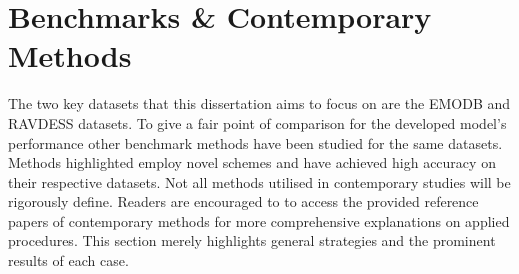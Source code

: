 \section{Benchmarks \& Contemporary Methods}
The two key datasets that this dissertation aims to focus on are the EMODB and RAVDESS datasets. To give a fair point of comparison for the developed model's performance other benchmark methods have been studied for the same datasets. Methods highlighted employ novel schemes and have achieved high accuracy on their respective datasets. Not all methods utilised in contemporary studies will be rigorously define. Readers are encouraged to to access the provided reference papers of contemporary methods for more comprehensive explanations on applied procedures. This section merely highlights general strategies and the prominent results of each case.

